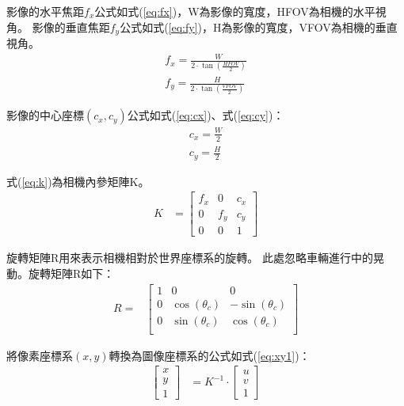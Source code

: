 \documentclass[12pt]{article}       %
\begin{document}
影像的水平焦距$f_{x}$公式如式(\ref{eq:fx})，W為影像的寬度，HFOV為相機的水平視角。
影像的垂直焦距$f_{y}$公式如式(\ref{eq:fy})，H為影像的寬度，VFOV為相機的垂直視角。
\begin{align}
    f_{x}=\frac{W}{2\cdot\tan\left(\frac{HFOV}{2}\right)}
    \label{eq:fx}
    \\
    f_{y}=\frac{H}{2\cdot\tan\left(\frac{VFOV}{2}\right)}
    \label{eq:fy}
\end{align}

影像的中心座標$(c_x,c_y)$公式如式(\ref{eq:cx})、式(\ref{eq:cy})：
\begin{align}
    c_{x}=\frac{W}{2}
    \label{eq:cx}
    \\
    c_{y}=\frac{H}{2}
    \label{eq:cy}
\end{align}

式(\ref{eq:k})為相機內參矩陣K。
\begin{align}
    K &=
    \begin{bmatrix}
        f_{x}       & 0             & c_{x}     \\
        0           & f_{y}         & c_{y}     \\
        0           & 0             & 1
    \end{bmatrix} 
    \label{eq:k}
\end{align}

旋轉矩陣R用來表示相機相對於世界座標系的旋轉。
此處忽略車輛進行中的晃動。旋轉矩陣R如下：
\begin{align}
    R=&
    \begin{bmatrix}
        1   & 0  & 0 \\
        0   & \cos(\theta_{c})   & -\sin(\theta_{c}) \\
        0   & \sin(\theta_{c})   & \cos(\theta_{c}) \\
    \end{bmatrix} 
    \label{eq:R2}
\end{align}

將像素座標系$(x,y)$轉換為圖像座標系的公式如式(\ref{eq:xy1})：
\begin{align}
    \begin{bmatrix}
        x       \\
        y    \\
        1        
    \end{bmatrix} 
     &=K^{-1}\cdot
     \begin{bmatrix}
        u       \\
        v       \\
        1        
    \end{bmatrix} 
    \label{eq:xy1}
\end{align}
\end{document}
